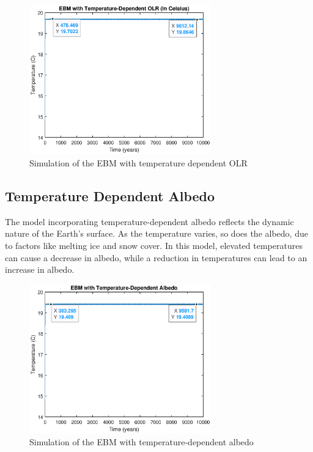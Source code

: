 \documentclass[12pt]{article}
\begin{document}

\begin{figure}[H]
    \centering
    \includegraphics[width=0.7\textwidth]{images/temperature_dependent_olr.eps}
    \caption{Simulation of the EBM with temperature dependent OLR}
    \label{fig:ebm_temperature_olr}
\end{figure}

\subsection{Temperature Dependent Albedo} \label{section:albedo-temperature}
The model incorporating temperature-dependent albedo reflects the dynamic nature of the Earth's surface. As the temperature varies, so does the albedo, due to factors like melting ice and snow cover\cite{kaper-2013-math-ac-albedo}. In this model, elevated temperatures can cause a decrease in albedo, while a reduction in temperatures can lead to an increase in albedo.

\begin{figure}[H]
    \centering
    \includegraphics[width=0.7\textwidth]{images/temperature_dependent_albedo.eps}
    \caption{Simulation of the EBM with temperature-dependent albedo}
    \label{fig:ebm_temperature_albedo}
\end{figure}
\end{document}
